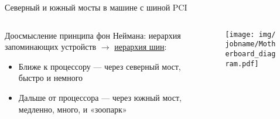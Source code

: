 \documentclass[xetex,aspectratio=43]{beamer}
\begin{document}
\begin{frame}{Северный и южный мосты в машине с шиной PCI}
    \begin{columns}
        \begin{column}{0.5\textwidth}
            Доосмысление принципа фон Неймана: иерархия запоминающих устройств \( \rightarrow \) \href{https://en.wikipedia.org/wiki/Northbridge_(computing)}{иерархия шин}:
            \begin{itemize}
                \item Ближе к процессору --- через северный мост, быстро и немного
                \item Дальше от процессора --- через южный мост, медленно, много, и «зоопарк»
            \end{itemize}
        \end{column}
        \begin{column}{0.5\textwidth}
            \vspace{-5mm}
            \begin{figure}
                \texttt{[image: img/\\jobname/Motherboard\_diagram.pdf]}
            \end{figure}
        \end{column}
    \end{columns}
\end{frame}

\section*{}
\end{document}

